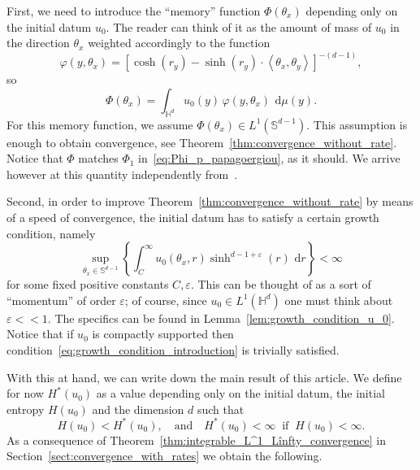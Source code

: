 \documentclass[12pt,longbibliography]{article}
\def\S{\mathbb{S}}
\def\d{\,\mathrm{d}}
\def\d{\,\mathrm{d}}
\def\H{\mathbb{H}}
\theoremstyle{definition}
\theoremstyle{remark}
\theoremstyle{example}
\begin{document}
First, we need to introduce the ``memory'' function $\Phi(\theta_x)$ depending only on the initial datum $u_0$. The reader can think of it as the amount of mass of $u_0$ in the direction $\theta_x$ weighted accordingly to the function
\[
\varphi(y,\theta_x)=[\cosh(r_y)-\sinh(r_y)\cdot\left\langle\theta_x,\theta_y\right\rangle]^{-(d-1)},
\]
so
\[
\Phi(\theta_x) = \int_{\H^d} u_0(y)\, \varphi(y, \theta_x)\ \d\mu(y).
\]
For this memory function, we assume $\Phi(\theta_x)\in L^1(\S^{d-1})$. This assumption is enough to obtain convergence, see Theorem~\ref{thm:convergence_without_rate}. Notice that $\Phi$ matches $\Phi_1$ in~\eqref{eq:Phi_p_papagoergiou}, as it should. We arrive however at this quantity independently from~\cite{Papageorgiou2025}.

Second, in order to improve Theorem~\ref{thm:convergence_without_rate} by means of a speed of convergence, the initial datum has to satisfy a certain growth condition, namely
\begin{equation}\label{eq:growth_condition_introduction}
\sup\limits_{\theta_x\in\S^{d-1}}\left\{\int_C^\infty u_0(\theta_x, r)\sinh^{d-1+\varepsilon}(r)\, \d r\right\} <\infty
\end{equation}
for some fixed positive constants $C,\varepsilon$. This can be thought of as a sort of ``momentum'' of order $\varepsilon$; of course, since $u_0\in L^1(\H^d)$ one must think about $\varepsilon << 1$. The specifics can be found in Lemma~\ref{lem:growth_condition_u_0}. Notice that if $u_0$ is compactly supported then condition~\eqref{eq:growth_condition_introduction} is trivially satisfied.

With this at hand, we can write down the main result of this article. We define for now $H^*(u_0)$ as a value depending only on the initial datum, the initial entropy $H(u_0)$ and the dimension $d$ such that
\[
H(u_0)<H^*(u_0),\quad\text{and}\quad H^*(u_0)<\infty\  \text{ if }\  H(u_0)<\infty.
\]
As a consequence of Theorem~\ref{thm:integrable_L^1_Lînfty_convergence} in Section~\ref{sect:convergence_with_rates} we obtain the following.
\end{document}
